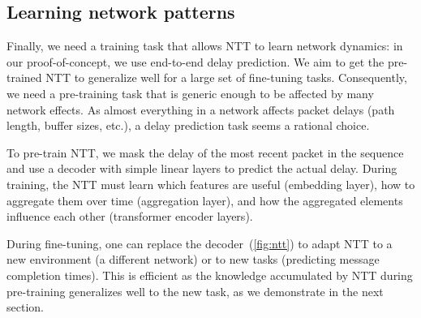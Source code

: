 \subsection{Learning network patterns}
\label{ssec:despatt}

Finally, we need a training task that allows NTT to learn network dynamics: in our proof-of-concept, we use end-to-end delay prediction.
We aim to get the pre-trained NTT to generalize well for a large set of fine-tuning tasks.
Consequently, we need a pre-training task that is generic enough to be affected by many network effects.
As almost everything in a network affects packet delays (\eg path length, buffer sizes, etc.), a delay prediction task seems a rational choice.

To pre-train NTT, we mask the delay of the most recent packet in the sequence and use a decoder with simple linear layers to predict the actual delay.
During training, the NTT must learn which features are useful (embedding layer), how to aggregate them over time (aggregation layer), and how the aggregated elements influence each other (transformer encoder layers).

During fine-tuning, one can replace the decoder~(\ref{fig:ntt}) to adapt NTT to a new environment (\eg a different network) or to new tasks (\eg predicting message completion times).
This is efficient as the knowledge accumulated by NTT during pre-training generalizes well to the new task, as we demonstrate in the next section.











